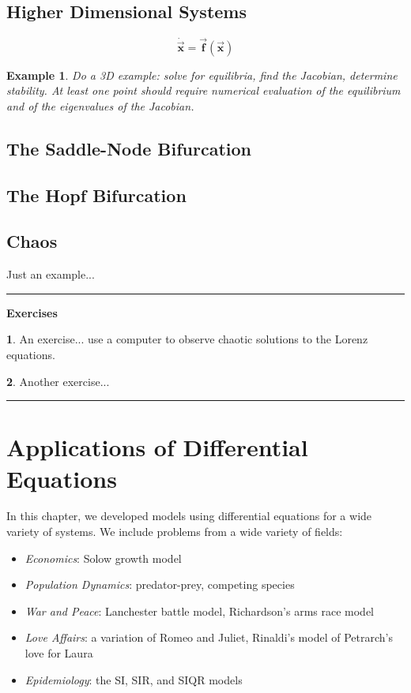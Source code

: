 \documentclass[reqno]{immbook}
\newcommand{\BF}{\vec{\textbf{f}}}
\newcommand{\BX}{\vec{\textbf{x}}}
\numberwithin{equation}{chapter}
\numberwithin{question}{section}
\numberwithin{theorem}{chapter}
\numberwithin{figure}{chapter}
\theoremstyle{definition}
\newtheorem{exercise}{}[section]
\newtheorem{example}{Example}[section]
\newenvironment{exercises}%
{%
\medskip\hrule\medskip\noindent\textbf{Exercises}%
}%
{%
\medskip\hrule
}
\begin{document}
\newpage

\section{Higher Dimensional Systems}
\[
  \dot{\BX} = \BF(\BX)
\]
\begin{example}
\emph{Do a 3D example: solve for equilibria, find the
Jacobian, determine stability.  At least one point
should require numerical evaluation of the equilibrium
and of the eigenvalues of the Jacobian.}
\end{example}
%

\section{The Saddle-Node Bifurcation}

\section{The Hopf Bifurcation}

\section{Chaos}
Just an example...

\begin{exercises}
\begin{exercise}
An exercise... use a computer to observe chaotic solutions
to the Lorenz equations.
\end{exercise}
\begin{exercise}
Another exercise...
\end{exercise}
\end{exercises}
%
%
%

\chapter{Applications of Differential Equations}
%
In this chapter, we developed models using differential
equations for a wide variety of systems.
We include problems from a wide variety of fields:
\begin{itemize}
\item \emph{Economics}: Solow growth model
\item \emph{Population Dynamics}: predator-prey, competing species
\item \emph{War and Peace}: Lanchester battle model, Richardson's arms
race model
\item \emph{Love Affairs}: a variation of Romeo and Juliet, Rinaldi's
model of Petrarch's love for Laura
\item \emph{Epidemiology}: the SI, SIR, and SIQR models
\end{itemize}
%
\newpage
%
\end{document}
